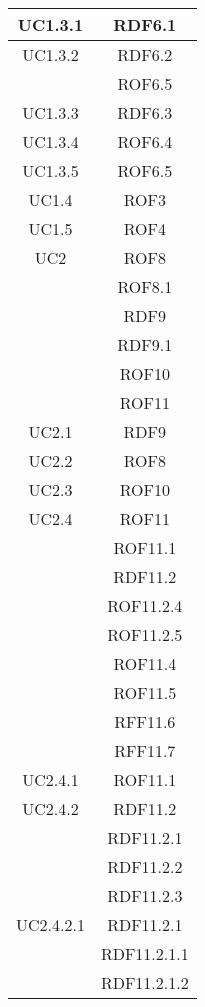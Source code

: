 \begin{longtable}{|c|c|}
\midrule
UC1.3.1
& RDF6.1\\

\midrule
UC1.3.2
& RDF6.2\\
& ROF6.5\\

\midrule
UC1.3.3
& RDF6.3\\

\midrule
UC1.3.4
& ROF6.4\\

\midrule
UC1.3.5
& ROF6.5\\

\midrule
UC1.4
& ROF3\\

\midrule
UC1.5
& ROF4\\


\midrule
UC2
& ROF8\\
& ROF8.1\\
& RDF9\\
& RDF9.1\\
& ROF10\\
& ROF11\\

\midrule
UC2.1
& RDF9\\

\midrule
UC2.2
& ROF8\\

\midrule
UC2.3
& ROF10\\

\midrule
UC2.4
& ROF11\\
& ROF11.1\\
& RDF11.2\\
& ROF11.2.4\\
& ROF11.2.5\\
& ROF11.4\\
& ROF11.5\\
& RFF11.6\\
& RFF11.7\\

\midrule
UC2.4.1
& ROF11.1\\

\midrule
UC2.4.2
& RDF11.2\\
& RDF11.2.1\\
& RDF11.2.2\\
& RDF11.2.3\\

\midrule
UC2.4.2.1
& RDF11.2.1\\
& RDF11.2.1.1\\
& RDF11.2.1.2\\


\end{longtable}
